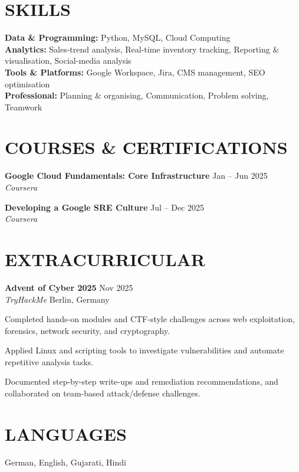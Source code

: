 \documentclass[10pt, letterpaper]{article}
\begin{document}
\section*{SKILLS}

\vspace{4pt}
\textbf{Data \& Programming:} Python, MySQL, Cloud Computing \\
\textbf{Analytics:} Sales-trend analysis, Real-time inventory tracking, Reporting \& visualisation, Social-media analysis \\
\textbf{Tools \& Platforms:} Google Workspace, Jira, CMS management, SEO optimisation \\
\textbf{Professional:} Planning \& organising, Communication, Problem solving, Teamwork

\section*{COURSES \& CERTIFICATIONS}

\vspace{4pt}
\textbf{Google Cloud Fundamentals: Core Infrastructure} \hfill Jan -- Jun 2025 \\
\textit{Coursera}

\vspace{4pt}
\textbf{Developing a Google SRE Culture} \hfill Jul -- Dec 2025 \\
\textit{Coursera}

\section*{EXTRACURRICULAR}

\vspace{4pt}
\textbf{Advent of Cyber 2025} \hfill Nov 2025 \\
\textit{TryHackMe} \hfill Berlin, Germany
\begin{cvitems}
    \item Completed hands-on modules and CTF-style challenges across web exploitation, forensics, network security, and cryptography.
    \item Applied Linux and scripting tools to investigate vulnerabilities and automate repetitive analysis tasks.
    \item Documented step-by-step write-ups and remediation recommendations, and collaborated on team-based attack/defense challenges.
\end{cvitems}

\section*{LANGUAGES}
\vspace{4pt}
German, English, Gujarati, Hindi
\end{document}

